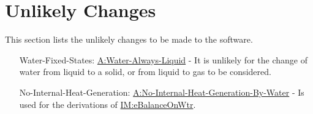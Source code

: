 \documentclass[12pt]{article}
\begin{document}
\section{Unlikely Changes}
\label{Sec:UCs}
This section lists the unlikely changes to be made to the software.

\begin{itemize}
\item[Water-Fixed-States:\phantomsection\label{unlikeChgWFS}]{\hyperref[assumpWAL]{A:Water-Always-Liquid} - It is unlikely for the change of water from liquid to a solid, or from liquid to gas to be considered.}
\item[No-Internal-Heat-Generation:\phantomsection\label{unlikeChgNIHG}]{\hyperref[assumpNIHGBW]{A:No-Internal-Heat-Generation-By-Water} - Is used for the derivations of \hyperref[IM:eBalanceOnWtr]{IM:eBalanceOnWtr}.}
\end{itemize}
\end{document}
